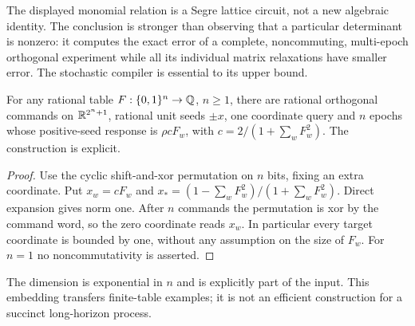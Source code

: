 The displayed monomial relation is a Segre lattice circuit, not a new
algebraic identity. The conclusion is stronger than observing that a
particular determinant is nonzero: it computes the exact error of a
complete, noncommuting, multi-epoch orthogonal experiment while all its
individual matrix relaxations have smaller error. The stochastic
compiler is essential to its upper bound.

\begin{proposition}\label{prop:embedding50}
For any rational table $F:\{0,1\}^n\to\mathbb Q$, $n\ge1$, there are rational
orthogonal commands on $\mathbb R^{2^n+1}$, rational unit seeds $\pm x$, one
coordinate query and $n$ epochs whose positive-seed response is
$\rho cF_w$, with $c=2/(1+\sum_wF_w^2)$. The construction is explicit.
\end{proposition}
\begin{proof}
Use the cyclic shift-and-xor permutation on $n$ bits, fixing an extra
coordinate. Put $x_w=cF_w$ and
$x_*=(1-\sum_wF_w^2)/(1+\sum_wF_w^2)$. Direct expansion gives norm
one. After $n$ commands the permutation is xor by the command word,
so the zero coordinate reads $x_w$. In particular every target
coordinate is bounded by one, without any assumption on the size of
$F_w$. For $n=1$ no noncommutativity is asserted.
\end{proof}
The dimension is exponential in $n$ and is explicitly part of the
input. This embedding transfers finite-table examples; it is not an
efficient construction for a succinct long-horizon process.
